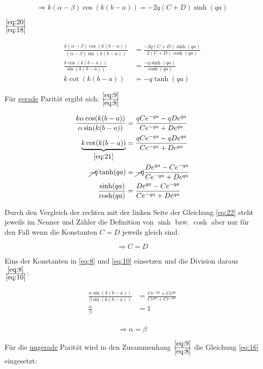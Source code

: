 \begin{equation}
  \label{eq:20}
 \Rightarrow  k(\alpha-\beta)\cos(k(b-a))=-2q(C+D)\sinh(qa)
\end{equation}


\( \frac{\eqref{eq:20}}{ \eqref{eq:18} } \)

\begin{align}
\frac{k(\alpha-\beta)\cos(k(b-a))}{(\alpha-\beta)\sin(k(b-a)) }&=  \frac{-2q(C+D)\sinh(qa)}{2(C+D)\cosh(qa) }\\
\frac{k\cos(k(b-a))}{\sin(k(b-a)) }&= \frac{-q\sinh(qa)}{\cosh(qa) }\\
k\cot(k(b-a)) &= -q \tanh(qa) \label{eq:21}
\end{align}


Für \underline{gerade} Parität ergibt sich:
\(\frac{\eqref{eq:9}}{\eqref{eq:8}}\)

\begin{align}  
  \frac{k\alpha\cos(k(b-a))}{\alpha\sin(k(b-a))} &= \frac{qCe^{-qa}-qDe^{qa}}{Ce^{-qa}+De^{qa}}\\
\underbrace{k\cot(k(b-a))}_{\eqref{eq:21}} &= \frac{qCe^{-qa}-qDe^{qa}}{Ce^{-qa}+De^{qa}}\\
\cancel{-q} \tanh(qa) &=\cancel{ -q} \frac{De^{qa}-Ce^{-qa}}{Ce^{-qa}+De^{qa}}\\
\frac{\sinh(qa)}{\cosh(qa)} &= \frac{De^{qa}-Ce^{-qa}}{Ce^{-qa}+De^{qa}}\label{eq:22}
\end{align}

Durch den Vergleich der rechten mit der linken Seite der Gleichung \eqref{eq:22} steht jeweils im Nenner und Zähler die Definition von \(\sinh\) bzw. \(\cosh\) aber nur für den Fall wenn die Konstanten \(C=D\) jeweils gleich sind.

\[\Rightarrow C=D\]

Eins der Konstanten in \eqref{eq:8} und  \eqref{eq:10} einsetzen und die Division daraus \(\frac{\eqref{eq:8}}{\eqref{eq:10}}\):

\begin{align}
  \label{eq:23}
\frac{\alpha\sin(k(b-a))}{\beta\sin(k(b-a))} &= \frac{Ce^{-qa}+Ce^{qa}}{ Ce^{qa}+Ce^{-qa}}\\
\frac{\alpha}{\beta} &= 1\\
\end{align}

\begin{equation}
  \label{eq:24}
 \Rightarrow  \alpha = \beta
\end{equation}

Für die \underline{ungerade} Parität wird in den Zusammenhang \(\frac{\eqref{eq:9}}{\eqref{eq:8}}\) die Gleichung \eqref{eq:16} eingesetzt:


